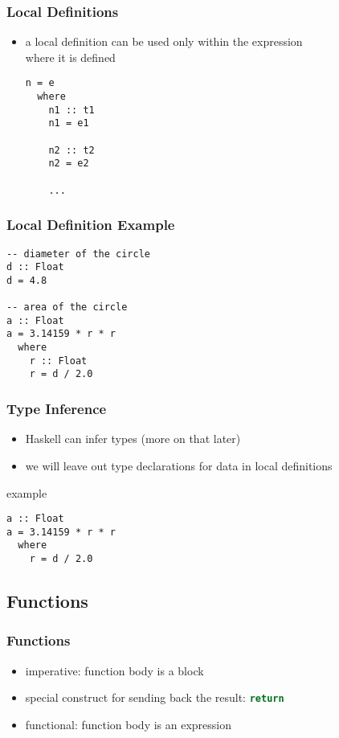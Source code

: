 \documentclass[dvipsnames]{beamer}
\theoremstyle{plain}
\begin{document}
\begin{frame}[fragile]
  \frametitle{Local Definitions}

  \begin{itemize}
    \item a local definition can be used only within the expression\\
      where it is defined
    \begin{lstlisting}[style=syntax]
n = e
  where
    n1 :: t1
    n1 = e1

    n2 :: t2
    n2 = e2

    ...
    \end{lstlisting}
  \end{itemize}
\end{frame}

\begin{frame}[fragile]
  \frametitle{Local Definition Example}

  \begin{lstlisting}
-- diameter of the circle
d :: Float
d = 4.8

-- area of the circle
a :: Float
a = 3.14159 * r * r
  where
    r :: Float
    r = d / 2.0
  \end{lstlisting}
\end{frame}

\begin{frame}[fragile]
  \frametitle{Type Inference}

  \begin{itemize}
    \item Haskell can infer types (more on that later)
    \item we will leave out type declarations for data in local definitions
  \end{itemize}

  \begin{exampleblock}{example}
    \begin{lstlisting}
a :: Float
a = 3.14159 * r * r
  where
    r = d / 2.0
    \end{lstlisting}
  \end{exampleblock}
\end{frame}

\subsection{Functions}

\begin{frame}
  \frametitle{Functions}

  \begin{itemize}
    \item imperative: function body is a block
    \item special construct for sending back the result:
      \lstinline[language=Python]{return}

    \bigskip
    \item functional: function body is an expression
  \end{itemize}
\end{frame}
\end{document}
